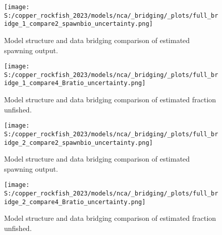 \documentclass[11pt,
  letterpaper,
]{article}
\begin{document}
\pagebreak

\begin{figure}
{\centering
\texttt{[image: S:/copper\_rockfish\_2023/models/nca/\_bridging/\_plots/full\_bridge\_1\_compare2\_spawnbio\_uncertainty.png]}
}
\caption{Model structure and data bridging comparison of estimated spawning output.\label{fig:data-bridge-ssb-1}}
\end{figure}

\pagebreak

\begin{figure}
{\centering
\texttt{[image: S:/copper\_rockfish\_2023/models/nca/\_bridging/\_plots/full\_bridge\_1\_compare4\_Bratio\_uncertainty.png]}
}
\caption{Model structure and data bridging comparison of estimated fraction unfished.\label{fig:data-bridge-depl-1}}
\end{figure}

\pagebreak

\begin{figure}
{\centering
\texttt{[image: S:/copper\_rockfish\_2023/models/nca/\_bridging/\_plots/full\_bridge\_2\_compare2\_spawnbio\_uncertainty.png]}
}
\caption{Model structure and data bridging comparison of estimated spawning output.\label{fig:data-bridge-ssb-2}}
\end{figure}

\pagebreak

\begin{figure}
{\centering
\texttt{[image: S:/copper\_rockfish\_2023/models/nca/\_bridging/\_plots/full\_bridge\_2\_compare4\_Bratio\_uncertainty.png]}
}
\caption{Model structure and data bridging comparison of estimated fraction unfished.\label{fig:data-bridge-depl-2}}
\end{figure}
\end{document}
